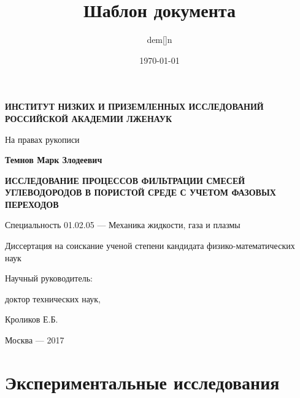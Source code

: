 \documentclass[a4paper,14pt]{article}
\author{dem[]n}
\title{Шаблон документа}
\date{\today}
\theoremstyle{plain} %
\theoremstyle{definition} %
\theoremstyle{remark} %
\begin{document}

\thispagestyle{empty} %


\begin{center}

\textbf{ИНСТИТУТ НИЗКИХ И ПРИЗЕМЛЕННЫХ ИССЛЕДОВАНИЙ РОССИЙСКОЙ АКАДЕМИИ ЛЖЕНАУК}

\begin{flushright}
На правах рукописи
\end{flushright}

\vspace{10ex}

\textbf{Темнов Марк Злодеевич}

\vspace{10ex}

\textbf{{\large ИССЛЕДОВАНИЕ ПРОЦЕССОВ ФИЛЬТРАЦИИ СМЕСЕЙ УГЛЕВОДОРОДОВ В ПОРИСТОЙ СРЕДЕ С УЧЕТОМ ФАЗОВЫХ ПЕРЕХОДОВ}}

\vspace{10ex}

Специальность 01.02.05 --- Механика жидкости, газа и плазмы

\vspace{10ex}

Диссертация на соискание ученой степени кандидата физико-математических наук

\vspace{10ex}

\begin{flushright}
Научный руководитель: 

доктор технических наук, 

Кроликов Е.Б.
\end{flushright}

\vfill

Москва --- 2017

\end{center}

\newpage

\section{Экспериментальные исследования}
\end{document}
